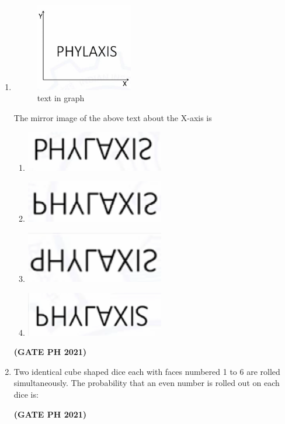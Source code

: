 \documentclass[14pt, a4paper]{extarticle}
\begin{document}
\begin{enumerate}[label=\textbf{Q.\arabic*}]
\item 
\begin{figure}[H]
\centering
\includegraphics[width=0.4\textwidth]{figs/q2fig21.png}
\caption{text in graph}
\label{fig:q2_original}
\end{figure}
The mirror image of the above text about the X-axis is
\begin{enumerate}
\item \includegraphics[width=0.5\textwidth]{figs/q2figA21.png}
\item \includegraphics[width=0.5\textwidth]{figs/q2figb21.png}
\item \includegraphics[width=0.5\textwidth]{figs/q2figc21.png}
\item \includegraphics[width=0.5\textwidth]{figs/q2figd21.png}
\end{enumerate}
\hfill \textbf{(GATE PH 2021)}

\item Two identical cube shaped dice each with faces numbered 1 to 6 are rolled simultaneously. The probability that an even number is rolled out on each dice is:
\begin{enumerate}
\end{enumerate}
\hfill \textbf{(GATE PH 2021)}


\end{enumerate}
\end{document}
